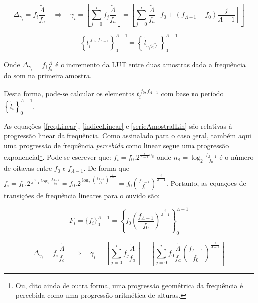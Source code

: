 \begin{equation}\label{indiceLinear}
\Delta_{\gamma_i}=f_i\frac{\widetilde{\Lambda}}{f_a} \quad \Rightarrow \quad \gamma_i=\left \lfloor \sum_{j=0}^{i} f_j\frac{\widetilde{\Lambda}}{f_a} \right \rfloor   =\left \lfloor \sum_{j=0}^{i} \frac{\widetilde{\Lambda}}{f_a} \left [f_0 + (f_{\Lambda-1}-f_0)\frac{j}{\Lambda-1} \right ] \right \rfloor 
\end{equation}

\begin{equation}\label{serieAmostralLin}
\left\{t_i^{\;\overline{f_0,\, f_{\Lambda-1}}}\right\}_0^{\Lambda-1}=\left\{\,\widetilde{l}_{\gamma_i \% \widetilde{\Lambda}}\,\right\}_0^{\Lambda-1}
\end{equation}

Onde $\Delta_{\gamma_i}=f_i\frac{\widetilde{\Lambda}}{f_a}$ é o incremento da LUT entre duas amostras dada a frequência do som na primeira amostra.

Desta forma, pode-se calcular os elementos $t_i^{\;\overline{f_0,f_{\Lambda-1}}}$
com base no período $\left\{\widetilde{l}_i\right\}_0^{\Lambda-1}$.

As equações \ref{freqLinear}, \ref{indiceLinear} e \ref{serieAmostralLin} são relativas à progressão linear
da frequência. Como assinalado para o caso geral, também aqui
uma progressão de frequência
\emph{percebida} como linear segue uma progressão exponencial\footnote{Ou,
dito ainda de outra forma, uma progressão geométrica da frequência
é percebida como uma progressão aritmética de alturas.}.
Pode-se escrever que: $f_i=f_0 . 2^{\frac{i}{\Lambda-1} n_8}$ onde 
$n_8=\log_2\frac{f_{\Lambda-1}}{f_0}$ é o número de oitavas entre $f_0$ e $f_{\Lambda-1}$.
De forma que $f_i=f_0 . 2^{\frac{i}{\Lambda-1}\log_2\frac{f_{\Lambda-1}}{f_0}}=
f_0 . 2^{\log_2\left ( \frac{f_{\Lambda-1}}{f_0} \right )^{\frac{i}{\Lambda-1}}}=
f_0 \left ( \frac{f_{\Lambda-1}}{f_0} \right ) ^{\frac{i}{\Lambda -1}}$. Portanto,
 as equações de transições de frequência
lineares para o ouvido são:

\begin{equation}\label{freqExponencial}
F_i=\{f_i\}_0^{\Lambda-1}=\left\{f_0 \left ( \frac{f_{\Lambda-1}}{f_0} \right ) ^{\frac{i}{\Lambda -1}} \right\}_0^{\Lambda-1}
\end{equation}

\begin{equation}\label{indiceExponencial}
\Delta_{\gamma_i}=f_i\frac{\widetilde{\Lambda}}{f_a} \quad \Rightarrow \quad \gamma_i=\left \lfloor \sum_{j=0}^{i} f_j\frac{\widetilde{\Lambda}}{f_a} \right \rfloor   =\left \lfloor \sum_{j=0}^{i} f_0 \frac{\widetilde{\Lambda}}{f_a} \left ( \frac{f_{\Lambda-1}}{f_0} \right ) ^{\frac{j}{\Lambda -1}} \right \rfloor
\end{equation}

